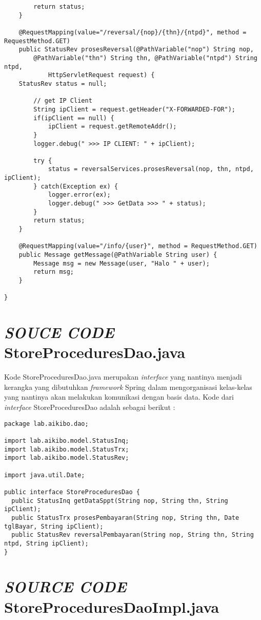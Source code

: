 \documentclass[pdftex,12pt, oneside]{article}
\begin{document}
\begin{lstlisting}
		return status;
	}

	@RequestMapping(value="/reversal/{nop}/{thn}/{ntpd}", method = RequestMethod.GET)
	public StatusRev prosesReversal(@PathVariable("nop") String nop,
	    @PathVariable("thn") String thn, @PathVariable("ntpd") String ntpd,
			HttpServletRequest request) {
    StatusRev status = null;

		// get IP Client
		String ipClient = request.getHeader("X-FORWARDED-FOR");
		if(ipClient == null) {
			ipClient = request.getRemoteAddr();
		}
		logger.debug(" >>> IP CLIENT: " + ipClient);

		try {
			status = reversalServices.prosesReversal(nop, thn, ntpd, ipClient);
		} catch(Exception ex) {
			logger.error(ex);
			logger.debug(" >>> GetData >>> " + status);
		}
		return status;
	}

	@RequestMapping(value="/info/{user}", method = RequestMethod.GET)
	public Message getMessage(@PathVariable String user) {
		Message msg = new Message(user, "Halo " + user);
		return msg;
	}

}
\end{lstlisting}


\section{\textit{SOUCE CODE} StoreProceduresDao.java}

Kode StoreProceduresDao.java merupakan \textit{interface} yang nantinya menjadi kerangka yang dibutuhkan \textit{framework} Spring dalam mengorganisasi kelas-kelas yang nantinya akan melakukan komunikasi dengan basis data. Kode dari \textit{interface} StoreProceduresDao adalah sebagai berikut :

\begin{lstlisting}
package lab.aikibo.dao;

import lab.aikibo.model.StatusInq;
import lab.aikibo.model.StatusTrx;
import lab.aikibo.model.StatusRev;

import java.util.Date;

public interface StoreProceduresDao {
  public StatusInq getDataSppt(String nop, String thn, String ipClient);
  public StatusTrx prosesPembayaran(String nop, String thn, Date tglBayar, String ipClient);
  public StatusRev reversalPembayaran(String nop, String thn, String ntpd, String ipClient);
}
\end{lstlisting}


\section{\textit{SOURCE CODE} StoreProceduresDaoImpl.java}
\end{document}
